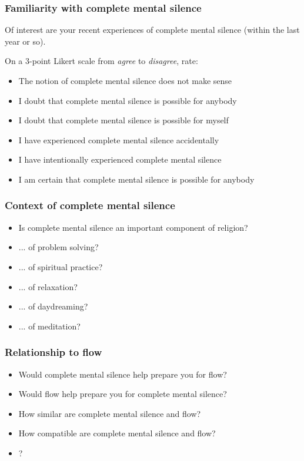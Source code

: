 \documentclass[10pt,utf8x]{beamer}
\begin{document}
\begin{frame}
  \frametitle{Familiarity with complete mental silence}

Of interest are your recent experiences of complete mental silence
(within the last year or so).

On a 3-point Likert scale from \emph{agree} to \emph{disagree}, rate:

\begin{itemize}
\item The notion of complete mental silence does not make sense
\item I doubt that complete mental silence is possible for anybody
\item I doubt that complete mental silence is possible for myself
\item I have experienced complete mental silence accidentally
\item I have intentionally experienced complete mental silence
\item I am certain that complete mental silence is possible for anybody
\end{itemize}

\end{frame}

\begin{frame}
  \frametitle{Context of complete mental silence}

\begin{itemize}
\item Is complete mental silence an important component of religion?
\item ... of problem solving?
\item ... of spiritual practice?
\item ... of relaxation?
\item ... of daydreaming?
\item ... of meditation?
\end{itemize}

\end{frame}

\begin{frame}
  \frametitle{Relationship to flow}

\begin{itemize}
\item Would complete mental silence help prepare you for flow?
\item Would flow help prepare you for complete mental silence?
\item How similar are complete mental silence and flow?
\item How compatible are complete mental silence and flow?
\item ?
\end{itemize}

\end{frame}

 

\end{document}
